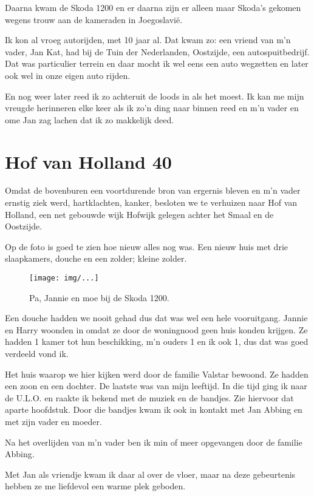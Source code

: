 \documentclass[10pt,twoside,openright]{memoir}
\begin{document}
Daarna kwam de Skoda 1200 en er daarna zijn er alleen maar Skoda's gekomen wegens trouw aan de kameraden in Joegoslavië. 

Ik kon al vroeg autorijden, met 10 jaar al. Dat kwam zo: een vriend van m'n vader, Jan Kat, had bij de Tuin der Nederlanden, Oostzijde, een autospuitbedrijf. Dat was particulier terrein en daar mocht ik wel eens een auto wegzetten en later ook wel in onze eigen auto rijden. 

En nog weer later reed ik zo achteruit de loods in als het moest. Ik kan me mijn vreugde herinneren elke keer als ik zo'n ding naar binnen reed en m'n vader en ome Jan zag lachen dat ik zo makkelijk deed.

\chapter{Hof van Holland 40} %
\label{cha:hofvanholland}

Omdat de bovenburen een voortdurende bron van ergernis bleven en m’n vader ernstig ziek werd, hartklachten, kanker, besloten we te verhuizen naar Hof van Holland, een net gebouwde wijk Hofwijk gelegen achter het Smaal en de Oostzijde. 

Op de foto is goed te zien hoe nieuw alles nog was. Een nieuw huis met drie slaapkamers, douche en een zolder; kleine zolder. 

\begin{figure}[t]
\texttt{[image: img/...]}
\caption{Pa, Jannie en moe bij de Skoda 1200.}
\end{figure}

Een douche hadden we nooit gehad dus dat was wel een hele vooruitgang. Jannie en Harry woonden in omdat ze door de woningnood geen huis konden krijgen. Ze hadden 1 kamer tot hun beschikking, m’n ouders 1 en ik ook 1, dus dat was goed verdeeld vond ik. 

Het huis waarop we hier kijken werd door de familie Valstar bewoond. Ze hadden een zoon en een dochter. De laatste was van mijn leeftijd. In die tijd ging ik naar de U.L.O. en raakte ik bekend met de muziek en de bandjes. Zie hiervoor dat aparte hoofdstuk. Door die bandjes kwam ik ook in kontakt met Jan Abbing en met zijn vader en moeder. 

Na het overlijden van m’n vader ben ik min of meer opgevangen door de familie Abbing. 

Met Jan als vriendje kwam ik daar al over de vloer, maar na deze gebeurtenis hebben ze me liefdevol een warme plek geboden.
\end{document}
